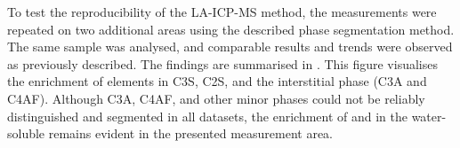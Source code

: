 To test the reproducibility of the LA-ICP-MS method, the measurements were repeated on two additional areas using the described phase segmentation method.
The same sample was analysed, and comparable results and trends were observed as previously described.
The findings are summarised in .
This figure visualises the enrichment of elements in \ac{C3S}, \ac{C2S}, and the interstitial phase (\ac{C3A} and \ac{C4AF}).
Although \ac{C3A}, \ac{C4AF}, and other minor phases could not be reliably distinguished and segmented in all datasets, the enrichment of  and  in the water-soluble  remains evident in the presented measurement area.

